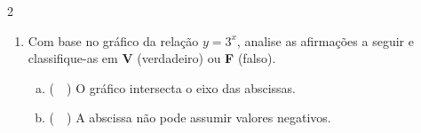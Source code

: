 \documentclass[a4paper,14pt]{article}
\begin{document}
\begin{multicols}{2}
\begin{enumerate}
\begin{enumerate}[a)]
	        	\item $y = \frac{8}{x}, x \in \mathbb{R_+^*}$ \\\\\\\\\\\\\\\\\\\\\\\\\\\\\\\\\\
	        	\item $y = -x^2 + 6$ \\\\\\\\\\\\\\\\\\\\\\\\\\\\
	        	\item $y = |x|$ \\\\\\\\\\\\\\\\\\\\\\\\\\\\
	        \end{enumerate}
            \item Com base no gráfico da relação $y = 3^x$, analise as afirmações a seguir e classifique-as em \textbf{V} (verdadeiro) ou \textbf{F} (falso).
            \begin{enumerate}[a)]
            	\item (~~) O gráfico intersecta o eixo das abscissas.
            	\item (~~) A abscissa não pode assumir valores negativos.

\end{enumerate}
\end{enumerate}
\end{multicols}
\end{document}
